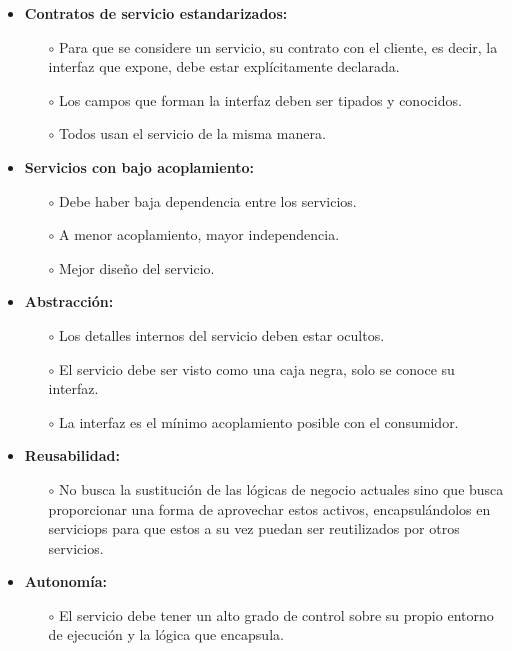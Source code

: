 \begin{itemize}
    \item \textbf{Contratos de servicio estandarizados:}
    \begin{itemize}
        \item[$\circ$] Para que se considere un servicio, su contrato con el cliente, es decir, la interfaz que expone, debe estar explícitamente declarada.
        \item[$\circ$] Los campos que forman la interfaz deben ser tipados y conocidos.
        \item[$\circ$] Todos usan el servicio de la misma manera.  
    \end{itemize}
    \item \textbf{Servicios con bajo acoplamiento:}
    \begin{itemize}
        \item[$\circ$] Debe haber baja dependencia entre los servicios.
        \item[$\circ$] A menor acoplamiento, mayor independencia.
        \item[$\circ$] Mejor diseño del servicio. 
    \end{itemize}
    \item \textbf{Abstracción:}
    \begin{itemize}
        \item[$\circ$] Los detalles internos del servicio deben estar ocultos.
        \item[$\circ$] El servicio debe ser visto como una caja negra, solo se conoce su interfaz.
        \item[$\circ$] La interfaz es el mínimo acoplamiento posible con el consumidor.
    \end{itemize}
    \item \textbf{Reusabilidad:}
    \begin{itemize}
        \item [$\circ$] No busca la sustitución de las lógicas de negocio actuales sino que busca proporcionar una forma de aprovechar estos activos, encapsulándolos en serviciops para que estos a su vez puedan ser reutilizados por otros servicios.
    \end{itemize}
    \item \textbf{Autonomía:}
    \begin{itemize}
        \item [$\circ$] El servicio debe tener un alto grado de control sobre su propio entorno de ejecución y la lógica que encapsula.
    \end{itemize}

\end{itemize}
